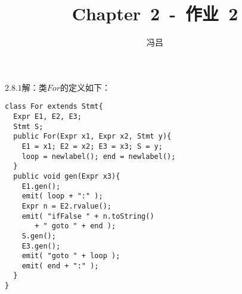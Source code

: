 \documentclass{homework}
\title{Chapter\ 2\ -\ 作业\ 2}
\author{冯吕}
\begin{document}
\maketitle
$2.8.1$解：类$For$的定义如下：
\begin{lstlisting}
class For extends Stmt{
  Expr E1, E2, E3;
  Stmt S;
  public For(Expr x1, Expr x2, Stmt y){
	E1 = x1; E2 = x2; E3 = x3; S = y;
	loop = newlabel(); end = newlabel();
  }
  public void gen(Expr x3){
	E1.gen();
	emit( loop + ":" );
	Expr n = E2.rvalue();
	emit( "ifFalse " + n.toString() 
	   + " goto " + end );
	S.gen();
	E3.gen();
	emit( "goto " + loop );
	emit( end + ":" );
  }
}
\end{lstlisting}
\end{document}
